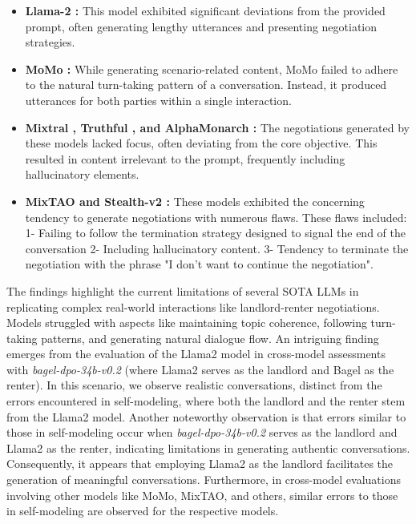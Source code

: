 \documentclass[runningheads]{llncs}
\begin{document}
\begin{itemize}
    \item \textbf{Llama-2 \cite{touvron_llama_2023}:} This model exhibited significant deviations from the provided prompt, often generating lengthy utterances and presenting negotiation strategies.
    \item \textbf{MoMo \cite{noauthor_morehmomo-72b-lora-186-dpo_nodate}:} While generating scenario-related content, MoMo failed to adhere to the natural turn-taking pattern of a conversation. Instead, it produced utterances for both parties within a single interaction.
    
    \item \textbf{Mixtral \cite{jiang_mixtral_2024}, Truthful \cite{noauthor_yunconglongtruthful_dpo_tomgrc_fusionnet_7bx2_moe_13b_nodate}, and AlphaMonarch \cite{noauthor_abideenalphamonarch-laser_2024}:} The negotiations generated by these models lacked focus, often deviating from the core objective. This resulted in content irrelevant to the prompt, frequently including hallucinatory elements. 
   
    \item \textbf{MixTAO \cite{noauthor_zhengrmixtao-7bx2-moe-instruct-v70_nodate} and Stealth-v2 \cite{noauthor_jan-hqstealth-v2_nodate}:} These models exhibited the concerning tendency to generate negotiations with numerous flaws. These flaws included:
    1- Failing to follow the termination strategy designed to signal the end of the conversation
    2- Including hallucinatory content.
    3- Tendency to terminate the negotiation with the phrase "I don't want to continue the negotiation".
    
\end{itemize}

The findings highlight the current limitations of several SOTA LLMs in replicating complex real-world interactions like landlord-renter negotiations. Models struggled with aspects like maintaining topic coherence, following turn-taking patterns, and generating natural dialogue flow. An intriguing finding emerges from the evaluation of the Llama2 model in cross-model assessments with \textit{bagel-dpo-34b-v0.2} (where Llama2 serves as the landlord and Bagel as the renter). In this scenario, we observe realistic conversations, distinct from the errors encountered in self-modeling, where both the landlord and the renter stem from the Llama2 model. Another noteworthy observation is that errors similar to those in self-modeling occur when \textit{bagel-dpo-34b-v0.2} serves as the landlord and Llama2 as the renter, indicating limitations in generating authentic conversations. Consequently, it appears that employing Llama2 as the landlord facilitates the generation of meaningful conversations. Furthermore, in cross-model evaluations involving other models like MoMo, MixTAO, and others, similar errors to those in self-modeling are observed for the respective models.
\end{document}
